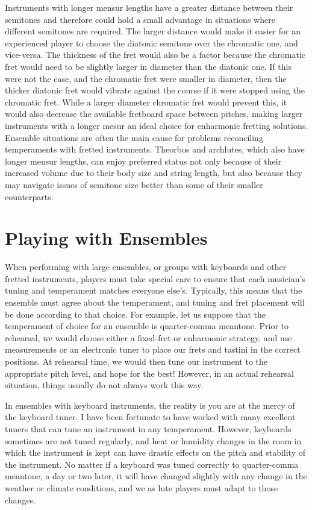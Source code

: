 Instruments with longer mensur lengths have a greater distance between their semitones and therefore
could hold a small advantage in situations where different semitones are required. The larger
distance would make it easier for an experienced player to choose the diatonic semitone over the
chromatic one, and vice-versa. The thickness of the fret would also be a factor because the
chromatic fret would need to be slightly larger in diameter than the diatonic one. If this were not
the case, and the chromatic fret were smaller in diameter, then the thicker diatonic fret would
vibrate against the course if it were stopped using the chromatic fret.  While a larger diameter
chromatic fret would prevent this, it would also decrease the available fretboard space between
pitches, making larger instruments with a longer mesur an ideal choice for
enharmonic fretting solutions.  Ensemble situations are often the main cause for
problems reconciling temperaments with fretted instruments.  Theorbos and archlutes, which also have longer mensur lengths,
can enjoy preferred status not only because of their increased volume due to their body size and
string length, but also because they may navigate issues of semitone size better than some of their
smaller counterparts.

\section{Playing with Ensembles}

When performing with large ensembles, or groups with keyboards and other fretted instruments,
players must take special care to ensure that each musician's tuning and temperament matches
everyone else's. Typically, this means that the ensemble must agree about the temperament, 
and tuning and fret placement will be done according to that choice.  For example,
let us suppose that the temperament of choice for an ensemble is quarter-comma meantone.  Prior to
rehearsal, we would choose either a fixed-fret or enharmonic strategy, and use measurements or an
electronic tuner to place our frets and tastini in the correct positions.  At rehearsal time, we
would then tune our instrument to the appropriate pitch level, and hope for the best!  However, in
an actual rehearsal situation, things usually do not always work this way.

In ensembles with keyboard instruments, the reality is you are at the mercy of the keyboard tuner.
I have been fortunate to have worked with many excellent tuners that can tune an instrument in any
temperament.  However, keyboards sometimes are not tuned regularly, and heat or humidity changes in
the room in which the instrument is kept can have drastic effects on the pitch and stability of the
instrument.  No matter if a keyboard was tuned correctly to quarter-comma meantone, a day or two
later, it will have changed slightly with any change in the weather or climate conditions, and we
as lute players must adapt to those changes.

